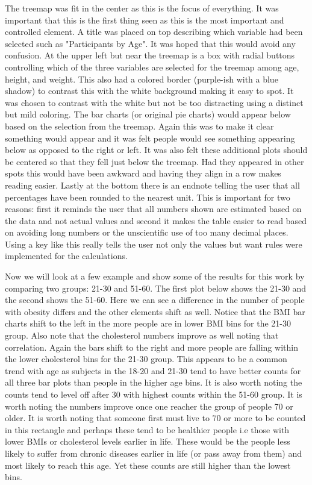\documentclass[12pt]{article}
\numberwithin{figure}{section}
\begin{document}
The treemap was fit in the center as this is the focus of everything.  It was important that this is the first thing seen as this is the most important and controlled element.  A title was placed on top describing which variable had been selected such as "Participants by Age".  It was hoped that this would avoid any confusion.  At the upper left but near the treemap is a box with radial buttons controlling which of the three variables are selected for the treemap among age, height, and weight.  This also had a colored border (purple-ish with a blue shadow) to contrast this with the white background making it easy to spot.  It was chosen to contrast with the white but not be too distracting using a distinct but mild coloring.  The bar charts (or original pie charts) would appear below based on the selection from the treemap.  Again this was to make it clear something would appear and it was felt people would see something appearing below as opposed to the right or left.  It was also felt these additional plots should be centered so that they fell just below the treemap.  Had they appeared in other spots this would have been awkward and having they align in a row makes reading easier.  Lastly at the bottom there is an endnote telling the user that all percentages have been rounded to the nearest unit.  This is important for two reasons: first it reminds the user that all numbers shown are estimated based on the data and not actual values and second it makes the table easier to read based on avoiding long numbers or the unscientific use of too many decimal places.  Using a key like this really tells the user not only the values but want rules were implemented for the calculations.

Now we will look at a few example and show some of the results for this work by comparing two groups: 21-30 and 51-60.  The first plot below shows the 21-30 and the second shows the 51-60.  Here we can see a difference in the number of people with obesity differs and the other elements shift as well.  Notice that the BMI bar charts shift to the left in the more people are in lower BMI bins for the 21-30 group.  Also note that the cholesterol numbers improve as well noting that correlation.  Again the bars shift to the right and more people are falling within the lower cholesterol bins for the 21-30 group.  This appears to be a common trend with age as subjects in the 18-20 and 21-30 tend to have better counts for all three bar plots than people in the higher age bins.  It is also worth noting the counts tend to level off after 30 with highest counts within the 51-60 group.  It is worth noting the numbers improve once one reacher the group of people 70 or older.  It is worth noting that someone first must live to 70 or more to be counted in this rectangle and perhaps these tend to be healthier people i.e those with lower BMIs or cholesterol levels earlier in life.  These would be the people less likely to suffer from chronic diseases earlier in life (or pass away from them) and most likely to reach this age.  Yet these counts are still higher than the lowest bins.
\end{document}
